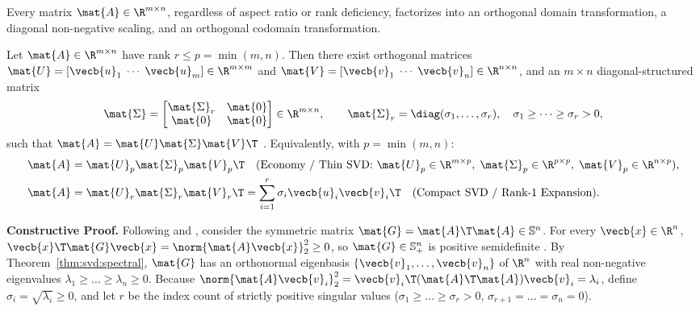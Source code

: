 \documentclass[../../../../master.tex]{subfiles}
\begin{document}
Every matrix $\mat{A} \in \R^{m \times n}$, regardless of aspect ratio or rank deficiency, factorizes into an orthogonal domain transformation, a diagonal non-negative scaling, and an orthogonal codomain transformation.

\begin{coremath}
\label{thm:svd:existence}
Let $\mat{A} \in \R^{m \times n}$ have rank $r \le p = \min(m,n)$. Then there exist orthogonal matrices $\mat{U} = [\vecb{u}_1 \;\cdots\; \vecb{u}_m] \in \R^{m \times m}$ and $\mat{V} = [\vecb{v}_1 \;\cdots\; \vecb{v}_n] \in \R^{n \times n}$, and an $m \times n$ diagonal-structured matrix
\[
  \mat{\Sigma} = \begin{bmatrix} \mat{\Sigma}_r & \mat{0} \\ \mat{0} & \mat{0} \end{bmatrix} \in \R^{m \times n},
  \qquad
  \mat{\Sigma}_r = \diag(\sigma_1,\dots,\sigma_r), \quad \sigma_1 \ge \dots \ge \sigma_r > 0,
\]
such that $\mat{A} = \mat{U}\mat{\Sigma}\mat{V}\T$  . Equivalently, with $p = \min(m,n)$:
\begin{align}
  \mat{A} &= \mat{U}_p \mat{\Sigma}_p \mat{V}_p\T \quad \text{(Economy / Thin SVD: }\mat{U}_p \in \R^{m\times p},\; \mat{\Sigma}_p \in \R^{p\times p},\; \mat{V}_p \in \R^{n\times p}\text{)}, \label{eq:svd:thin} \\
  \mat{A} &= \mat{U}_r \mat{\Sigma}_r \mat{V}_r\T = \sum_{i=1}^r \sigma_i \vecb{u}_i \vecb{v}_i\T \quad \text{(Compact SVD / Rank-1 Expansion)}. \label{eq:svd:compact}
\end{align}

\textbf{Constructive Proof.} Following  and , consider the symmetric matrix $\mat{G} = \mat{A}\T\mat{A} \in \mathbb{S}^n$. For every $\vecb{x} \in \R^n$, $\vecb{x}\T \mat{G} \vecb{x} = \norm{\mat{A}\vecb{x}}_2^2 \ge 0$, so $\mat{G} \in \mathbb{S}_+^n$ is positive semidefinite . By Theorem~\ref{thm:svd:spectral}, $\mat{G}$ has an orthonormal eigenbasis $\{\vecb{v}_1,\dots,\vecb{v}_n\}$ of $\R^n$ with real non-negative eigenvalues $\lambda_1 \ge \dots \ge \lambda_n \ge 0$. Because $\norm{\mat{A}\vecb{v}_i}_2^2 = \vecb{v}_i\T (\mat{A}\T\mat{A})\vecb{v}_i = \lambda_i$, define $\sigma_i = \sqrt{\lambda_i} \ge 0$, and let $r$ be the index count of strictly positive singular values ($\sigma_1 \ge \dots \ge \sigma_r > 0$, $\sigma_{r+1}=\dots=\sigma_n=0$).


\end{coremath}
\end{document}
